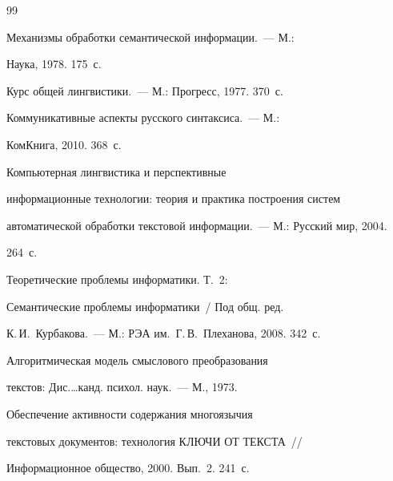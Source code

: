{\small\frenchspacing

{%


\begin{thebibliography}{99}

    




 Механизмы обработки семантической информации.~--- М.: 

Наука, 1978. 175~с.


 Курс общей лингвистики.~--- М.: Прогресс, 1977. 370~с. 


 Коммуникативные аспекты русского синтаксиса.~--- М.: 

КомКнига, 2010. 368~с.


 Компьютерная лингвистика и перспективные 

информационные технологии: теория и практика построения сис\-тем 

автоматической обработки текстовой информации.~---  М.: Русский мир, 2004. 

264~с.


 Теоретические проб\-ле\-мы информатики. Т.~2: 

Семантические проб\-ле\-мы информатики~/ Под общ. ред. 

К.\,И.~Курбакова.~--- М.: РЭА им.\ Г.\,В.~Плеханова, 2008. 342~с.




 Алгоритмическая модель смыс\-ло\-во\-го преобразования 

текс\-тов: Дис.\linebreak \ldots  канд. психол. наук.~--- М., 1973.




 Обеспечение активности содержания многоязычия 

текс\-то\-вых документов: технология КЛЮЧИ ОТ ТЕКСТА~/\!\!/ 

Информационное общество, 2000. Вып.~2. 241~с. 






\end{thebibliography}}}
